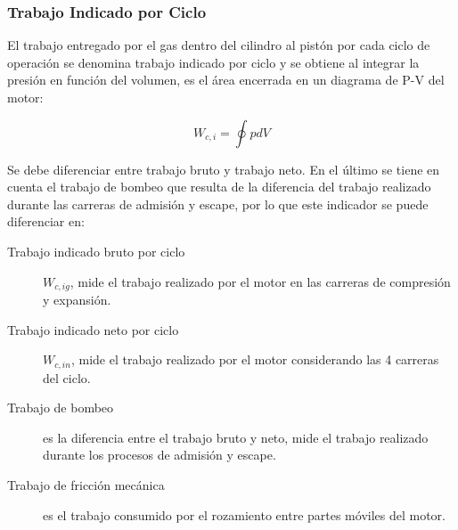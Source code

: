


\subsubsection{Trabajo Indicado por Ciclo}
%
El trabajo entregado por el gas dentro del cilindro al pistón por cada ciclo de
operación se denomina trabajo indicado por ciclo y se obtiene al integrar la
presión en función del volumen, es el área encerrada en un diagrama de P-V del
motor:

\begin{equation}\label{eq:w_indicado}
  W_{c,i} = \oint p dV
\end{equation}

Se debe diferenciar entre trabajo bruto y trabajo neto.
%
En el último se tiene en cuenta el trabajo de bombeo que resulta de la
diferencia del trabajo realizado durante las carreras de admisión y escape, por
lo que este indicador se puede diferenciar en:
%
\begin{description}
  \item [Trabajo indicado bruto por ciclo] $W_{c,ig}$, mide el trabajo realizado
por el motor en las carreras de compresión y expansión.
  \item [Trabajo indicado neto por ciclo] $W_{c,in}$, mide el trabajo realizado
por el motor considerando las 4 carreras del ciclo.
  \item [Trabajo de bombeo] es la diferencia entre el trabajo bruto y neto, mide
el trabajo realizado durante los procesos de admisión y escape.
  \item [Trabajo de fricción mecánica] es el trabajo consumido por el rozamiento entre
partes móviles del motor.
\end{description}


